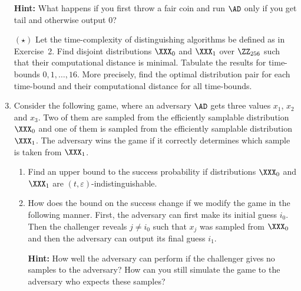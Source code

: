\documentclass{article}
\begin{document}
\begin{enumerate}
  \textbf{Hint:} What happens if you first throw a fair coin and run
  $\AD$ only if you get tail and otherwise output $0$?


\item[$(\star)$] Let the time-complexity of distinguishing algorithms
  be defined as in Exercise~2. Find disjoint distributions $\XXX_0$
  and $\XXX_1$ over $\ZZ_{256}$ such that their computational distance
  is minimal. Tabulate the results for time-bounds $0,1,\ldots,
  16$. More precisely, find the optimal distribution pair for each
  time-bound and their computational distance for all time-bounds.

\item Consider the following game, where an adversary $\AD$ gets three
  values $x_1$, $x_2$ and $x_3$. Two of them are sampled from the
  efficiently samplable distribution $\XXX_0$ and one of them is
  sampled from the efficiently samplable distribution $\XXX_1$. The
  adversary wins the game if it correctly determines which sample is
  taken from $\XXX_1$.
  \begin{enumerate}
  \item Find an upper bound to the success probability if
    distributions $\XXX_0$ and $\XXX_1$ are
    $(t,\varepsilon)$-indistinguishable.
  \item How does the bound on the success change if we modify the game
    in the following manner. First, the adversary can first make its
    initial guess $i_0$. Then the challenger reveals $j\neq i_0$ such
    that $x_j$ was sampled from $\XXX_0$ and then the adversary can
    output its final guess $i_1$.

    \textbf{Hint:} How well the adversary can perform if the
    challenger gives no samples to the adversary? How can you still
    simulate the game to the adversary who expects these samples?
   
\end{enumerate}



\end{enumerate}
\end{document}
